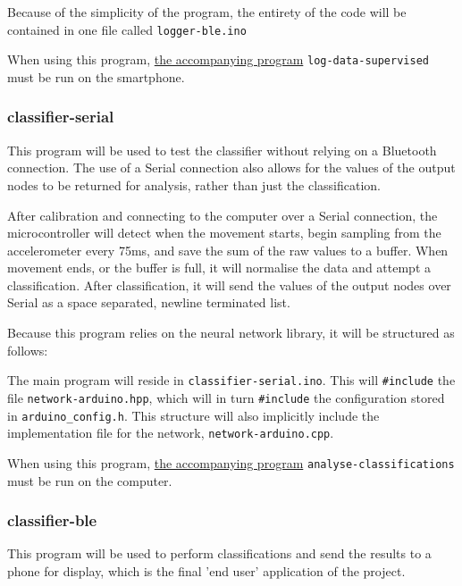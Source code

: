 \documentclass[a4paper]{article}
\begin{document}
Because of the simplicity of the program, the entirety of the code will be contained in one file called \lstinline{logger-ble.ino}

When using this program, \hyperref[subsubsec:dc_asa_logger]{the accompanying program} \lstinline{log-data-supervised} must be run on the smartphone.

\newpage
\subsubsection{classifier-serial}
\label{subsubsec:dc_msa_classifierserial}

This program will be used to test the classifier without relying on a Bluetooth connection. The use of a Serial connection also allows for the values of the output nodes to be returned for analysis, rather than just the classification.

After calibration and connecting to the computer over a Serial connection, the microcontroller will detect when the movement starts, begin sampling from the accelerometer every 75ms, and save the sum of the raw values to a buffer. When movement ends, or the buffer is full, it will normalise the data and attempt a classification. After classification, it will send the values of the output nodes over Serial as a space separated, newline terminated list.

Because this program relies on the neural network library, it will be structured as follows:

The main program will reside in \lstinline{classifier-serial.ino}. This will \lstinline{#include} the file \lstinline{network-arduino.hpp}, which will in turn \lstinline{#include} the configuration stored in \lstinline{arduino_config.h}. 
This structure will also implicitly include the implementation file for the network, \lstinline{network-arduino.cpp}.

When using this program, \hyperref[subsubsec:dc_csa_analyse]{the accompanying program} \lstinline{analyse-classifications} must be run on the computer.

\subsubsection{classifier-ble}%
\label{subsubsec:dc_msa_classifierble}

This program will be used to perform classifications and send the results to a phone for display, which is the final 'end user' application of the project.
\end{document}
